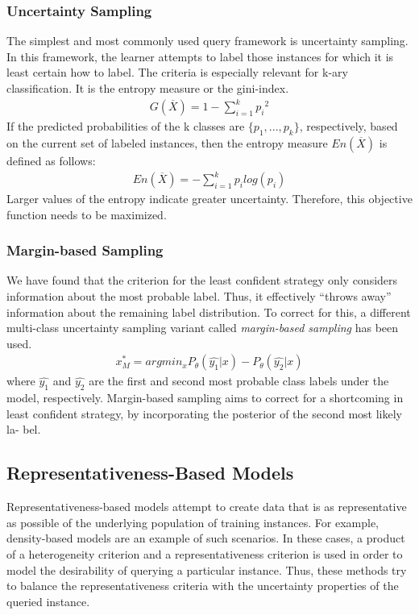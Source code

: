 \documentclass{acmtog}
\begin{document}
\subsubsection{Uncertainty Sampling}
The simplest and most commonly used query framework is uncertainty sampling. In this framework, the learner attempts to label those instances for which it is least certain how to label. 
The criteria is especially relevant for k-ary classification. It is the entropy measure or the gini-index. 
\begin{eqnarray}
G (\overline{X}) = 1-\sum_{i=1}^k {p_i}^2 
\end{eqnarray}
If the predicted probabilities of the k classes are $\{p_1,...,p_k\}$, respectively, based on the current set of labeled instances, then the entropy measure $En(\overline{X})$ is defined as follows:
\begin{eqnarray}
En(\overline{X}) = − \sum_{i=1}^k p_i log(p_i)
\end{eqnarray}
Larger values of the entropy indicate greater uncertainty. Therefore, this objective function needs to be maximized. 

\subsubsection{Margin-based Sampling}
We have found that the criterion for the least confident strategy only considers information about the most probable label. Thus, it effectively “throws away” information about the remaining label distribution. To correct for this, a different multi-class uncertainty sampling variant called\textit{ margin-based sampling} has been used.
\begin{eqnarray}
x^{*}_M =argmin_xP_{\theta}(\hat{y_1}|x)-P_{\theta}(\hat{y_2}|x)
\end{eqnarray}
where $\hat{y_1}$ and $\hat{y_2}$ are the first and second most probable class labels under the model, respectively. Margin-based sampling aims to correct for a shortcoming in least confident strategy, by incorporating the posterior of the second most likely la- bel. 
\subsection{Representativeness-Based Models}
Representativeness-based models attempt to create data that is as representative as possible of the underlying population of training instances. For example, density-based models are an example of such scenarios. In these cases, a product of a heterogeneity criterion and a representativeness criterion is used in order to model the desirability of querying a particular instance. Thus, these methods try to balance the representativeness criteria with the uncertainty properties of the queried instance.
\end{document}
